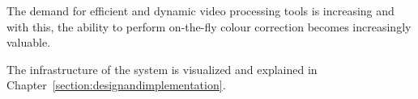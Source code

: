 \documentclass[12pt,a4paper]{article}
\begin{document}
The demand for efficient and dynamic video processing tools is increasing and with this, the ability to perform on-the-fly colour correction becomes increasingly valuable. 

The infrastructure of the system is visualized and explained in Chapter~\ref{section:designandimplementation}.









\end{document}
